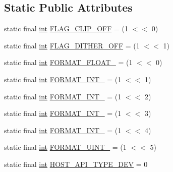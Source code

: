 \subsection*{Static Public Attributes}
\begin{DoxyCompactItemize}
\item 
static final \hyperlink{xmltok_8h_a5a0d4a5641ce434f1d23533f2b2e6653}{int} \hyperlink{classcom_1_1portaudio_1_1_port_audio_a2f395bc99fe477caba5d221849e14697}{F\+L\+A\+G\+\_\+\+C\+L\+I\+P\+\_\+\+O\+FF} = (1 $<$$<$ 0)
\item 
static final \hyperlink{xmltok_8h_a5a0d4a5641ce434f1d23533f2b2e6653}{int} \hyperlink{classcom_1_1portaudio_1_1_port_audio_a8b21f44b7fd8e5e78a314b5a043e4196}{F\+L\+A\+G\+\_\+\+D\+I\+T\+H\+E\+R\+\_\+\+O\+FF} = (1 $<$$<$ 1)
\item 
static final \hyperlink{xmltok_8h_a5a0d4a5641ce434f1d23533f2b2e6653}{int} \hyperlink{classcom_1_1portaudio_1_1_port_audio_a2d96208f8de10d8b5888aeaf5e43fa57}{F\+O\+R\+M\+A\+T\+\_\+\+F\+L\+O\+A\+T\+\_} = (1 $<$$<$ 0)
\item 
static final \hyperlink{xmltok_8h_a5a0d4a5641ce434f1d23533f2b2e6653}{int} \hyperlink{classcom_1_1portaudio_1_1_port_audio_ae9b9140287ddfa452a78a90762b8e2c2}{F\+O\+R\+M\+A\+T\+\_\+\+I\+N\+T\+\_} = (1 $<$$<$ 1)
\item 
static final \hyperlink{xmltok_8h_a5a0d4a5641ce434f1d23533f2b2e6653}{int} \hyperlink{classcom_1_1portaudio_1_1_port_audio_a7a63350a8781554741a49c72753551dd}{F\+O\+R\+M\+A\+T\+\_\+\+I\+N\+T\+\_} = (1 $<$$<$ 2)
\item 
static final \hyperlink{xmltok_8h_a5a0d4a5641ce434f1d23533f2b2e6653}{int} \hyperlink{classcom_1_1portaudio_1_1_port_audio_a038b2ecc4e7aff2cd9159d6c1acb2f17}{F\+O\+R\+M\+A\+T\+\_\+\+I\+N\+T\+\_} = (1 $<$$<$ 3)
\item 
static final \hyperlink{xmltok_8h_a5a0d4a5641ce434f1d23533f2b2e6653}{int} \hyperlink{classcom_1_1portaudio_1_1_port_audio_a598b92996b1e04767e4138d9851a800b}{F\+O\+R\+M\+A\+T\+\_\+\+I\+N\+T\+\_} = (1 $<$$<$ 4)
\item 
static final \hyperlink{xmltok_8h_a5a0d4a5641ce434f1d23533f2b2e6653}{int} \hyperlink{classcom_1_1portaudio_1_1_port_audio_a1f0cadf5525b51a67a75c02f22014ed0}{F\+O\+R\+M\+A\+T\+\_\+\+U\+I\+N\+T\+\_} = (1 $<$$<$ 5)
\item 
static final \hyperlink{xmltok_8h_a5a0d4a5641ce434f1d23533f2b2e6653}{int} \hyperlink{classcom_1_1portaudio_1_1_port_audio_a5aeefa7a9316b0fd60265a3b336e7a40}{H\+O\+S\+T\+\_\+\+A\+P\+I\+\_\+\+T\+Y\+P\+E\+\_\+\+D\+EV} = 0

\end{DoxyCompactItemize}
